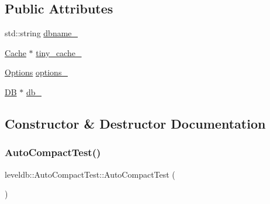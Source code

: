 \subsection*{Public Attributes}
\begin{DoxyCompactItemize}
\item 
std\+::string \mbox{\hyperlink{classleveldb_1_1_auto_compact_test_a9caaa257e508397f94fbe646893b7b3b}{dbname\+\_\+}}
\item 
\mbox{\hyperlink{classleveldb_1_1_cache}{Cache}} $\ast$ \mbox{\hyperlink{classleveldb_1_1_auto_compact_test_a189cb5733d861b7df8c3bf945180afe5}{tiny\+\_\+cache\+\_\+}}
\item 
\mbox{\hyperlink{structleveldb_1_1_options}{Options}} \mbox{\hyperlink{classleveldb_1_1_auto_compact_test_ad7f1f35214065627e4cadd0468d22c21}{options\+\_\+}}
\item 
\mbox{\hyperlink{classleveldb_1_1_d_b}{DB}} $\ast$ \mbox{\hyperlink{classleveldb_1_1_auto_compact_test_a9e8d5f9bf0546b7d7fdf2128c66d8761}{db\+\_\+}}
\end{DoxyCompactItemize}


\subsection{Constructor \& Destructor Documentation}
\mbox{\label{classleveldb_1_1_auto_compact_test_a31fe0ded855f188fac1650c70849760c}} 
\subsubsection{\texorpdfstring{AutoCompactTest()}{AutoCompactTest()}}
{\footnotesize\ttfamily leveldb\+::\+Auto\+Compact\+Test\+::\+Auto\+Compact\+Test (\begin{DoxyParamCaption}{ }\end{DoxyParamCaption})\hspace{0.3cm}{\ttfamily [inline]}}

